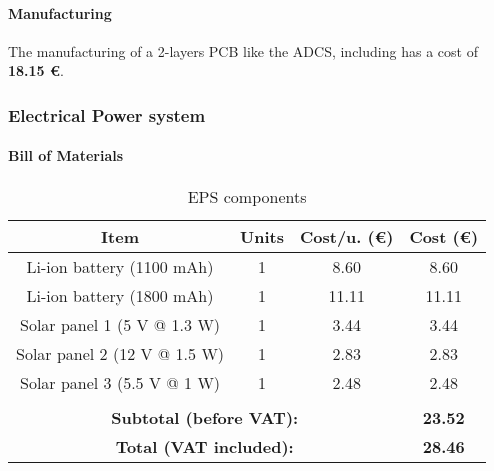 \begin{appendices}
\paragraph{Manufacturing}

The manufacturing of a 2-layers \acrshort{PCB} like the \acrshort{ADCS}, including  has a cost of \textbf{18.15 €}.

\subsubsection{Electrical Power system}
\paragraph{Bill of Materials}
\begin{table}[H]
\centering
\begin{tabular}{@{}cccc@{}}
\toprule
\textbf{Item}                & \textbf{Units}       & \textbf{Cost/u. (€)} & \textbf{Cost (€)}    \\ \midrule
Li-ion battery (1100 mAh)    & 1                    & 8.60                 & 8.60                 \\
Li-ion battery (1800 mAh)    & 1                    & 11.11                & 11.11                \\
Solar panel 1 (5 V @ 1.3 W)  & 1                    & 3.44                 & 3.44                 \\
Solar panel 2 (12 V @ 1.5 W) & 1                    & 2.83                 & 2.83                 \\
Solar panel 3 (5.5 V @ 1 W)  & 1                    & 2.48                 & 2.48                 \\
\multicolumn{1}{l}{}         & \multicolumn{1}{l}{} & \multicolumn{1}{l}{} & \multicolumn{1}{l}{} \\
\multicolumn{3}{c}{\textbf{Subtotal (before VAT):}}                        & \textbf{23.52}       \\
\multicolumn{3}{c}{\textbf{Total (VAT included):}}                         & \textbf{28.46}       \\ \bottomrule
\end{tabular}
\caption{\acrshort{EPS} components}
\label{epscomp}
\end{table}




\end{appendices}
